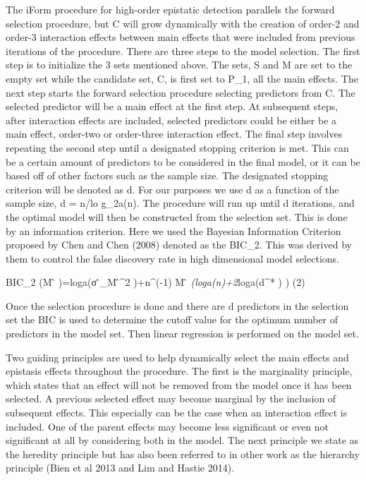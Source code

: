 \documentclass[]{book}
\theoremstyle{definition}
\theoremstyle{definition}
\theoremstyle{remark}
\begin{document}
The iForm procedure for high-order epistatic detection parallels the
forward selection procedure, but C will grow dynamically with the
creation of order-2 and order-3 interaction effects between main effects
that were included from previous iterations of the procedure. There are
three steps to the model selection. The first step is to initialize the
3 sets mentioned above. The sets, S and M are set to the empty set while
the candidate set, C, is first set to P\_1, all the main effects. The
next step starts the forward selection procedure selecting predictors
from C. The selected predictor will be a main effect at the first step.
At subsequent steps, after interaction effects are included, selected
predictors could be either be a main effect, order-two or order-three
interaction effect. The final step involves repeating the second step
until a designated stopping criterion is met. This can be a certain
amount of predictors to be considered in the final model, or it can be
based off of other factors such as the sample size. The designated
stopping criterion will be denoted as d. For our purposes we use d as a
function of the sample size, d = n/lo g\_2a(n). The procedure will run
up until d iterations, and the optimal model will then be constructed
from the selection set. This is done by an information criterion. Here
we used the Bayesian Information Criterion proposed by Chen and Chen
(2008) denoted as the BIC\_2. This was derived by them to control the
false discovery rate in high dimensional model selections.

BIC\_2 (M ̂ )=loga(σ ̂\_M ̂\^{}2 )+n\^{}(-1) \textbar{}M ̂
\textbar{}\emph{(loga(n)+2}loga(d\^{}* ) ) (2)

Once the selection procedure is done and there are d predictors in the
selection set the BIC is used to determine the cutoff value for the
optimum number of predictors in the model set. Then linear regression is
performed on the model set.

Two guiding principles are used to help dynamically select the main
effects and epistasis effects throughout the procedure. The first is the
marginality principle, which states that an effect will not be removed
from the model once it has been selected. A previous selected effect may
become marginal by the inclusion of subsequent effects. This especially
can be the case when an interaction effect is included. One of the
parent effects may become less significant or even not significant at
all by considering both in the model. The next principle we state as the
heredity principle but has also been referred to in other work as the
hierarchy principle (Bien et al 2013 and Lim and Hastie 2014).
\end{document}
